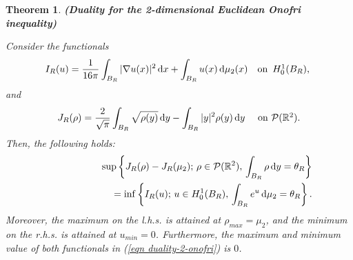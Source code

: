 \documentclass[10pt]{article}
\numberwithin{equation}{section}
\theoremstyle{plain}
\newtheorem{thm}{Theorem}[section]
\theoremstyle{definition}
\theoremstyle{remark}
\newcommand\R{{\mathbb R}}
\newcommand\dd{\,\mbox{d} }
\begin{document}
\begin{thm}{\bf (Duality for the 2-dimensional Euclidean Onofri inequality)} \label{theo 2-duality}

Consider the functionals 
\[I_R(u) = \frac{1}{16\pi} \int_{B_R} |\nabla u(x)|^2\dd x + \int_{B_R} u(x)\dd \mu_2(x)\hbox{\quad  {\rm on}\,  $H^1_0(B_R)$, }\]
and
\[J_R(\rho)=\frac{2}{\sqrt{\pi}} \int_{B_R} \sqrt{\rho(y)}\dd y - \int_{B_R} |y|^2\rho(y)\dd y\hbox{ \quad {\rm on} ${\cal P}(\R^2)$.}\]
Then, the following holds:
\begin{eqnarray}\label{eqn duality-2-onofri}
&&\sup\left\{ J_R(\rho) - J_R(\mu_2);\,  \rho\in {\cal P}(\R^2),\,  \int_{B_R}\rho\dd y
=\theta_R \right\} \nonumber\\
&&\qquad \qquad \qquad= \inf\left\{ I_R(u);\, u\in H^1_0(B_R),\,  \int_{B_R}e^u\dd\mu_2 =\theta_R\right\}.
\end{eqnarray}
Moreover, the maximum on the l.h.s. is attained at $\rho_{max}=\mu_2$, and the minimum on the r.h.s. is attained at $u_{min} = 0$. Furthermore, the maximum and minimum value of  both functionals in (\ref{eqn duality-2-onofri}) is $0$. 
\end{thm}
\end{document}
